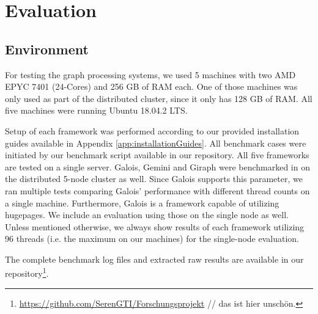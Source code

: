 
\section{Evaluation}

\subsection{Environment}
For testing the graph processing systems, we used 5 machines with two AMD EPYC 7401 (24-Cores) and 256 GB of RAM each. One of those machines was only used as part of the distributed cluster, since it only has 128 GB of RAM.
All five machines were running Ubuntu 18.04.2 LTS.

Setup of each framework was performed according to our provided installation guides available in Appendix \ref{app:installationGuides}.
All benchmark cases were initiated by our benchmark script available in our repository.
All five frameworks are tested on a single server.
Galois, Gemini and Giraph were benchmarked in on the distributed 5-node cluster as well.
Since Galois supports this parameter, we ran multiple tests comparing Galois' performance with different thread counts on a single machine.
Furthermore, Galois is a framework capable of utilizing hugepages. We include an evaluation using those on the single node as well.
Unless mentioned otherwise, we always show results of each framework utilizing 96 threads (i.e. the maximum on our machines) for the single-node evaluation.

The complete benchmark log files and extracted raw results are available in our repository\footnote{\url{https://github.com/SerenGTI/Forschungsprojekt} // das ist hier unschön.}.


